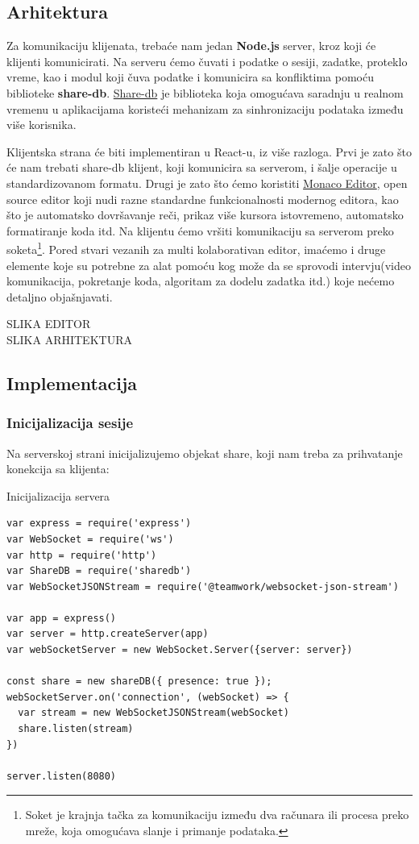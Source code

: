 \documentclass[12pt]{article}
\begin{document}
\subsection{Arhitektura}

Za komunikaciju klijenata, trebaće nam jedan \textbf{Node.js} server, kroz koji će klijenti komunicirati. Na serveru ćemo čuvati i podatke o sesiji, zadatke, proteklo vreme, kao i modul koji čuva podatke i komunicira sa konfliktima pomoću biblioteke \textbf{share-db}. \href{https://share.github.io/sharedb/}{Share-db} je biblioteka koja omogućava saradnju u realnom vremenu u aplikacijama koristeći mehanizam za sinhronizaciju podataka između više korisnika. 

Klijentska strana će biti implementiran u React-u, iz više razloga. Prvi je zato što će nam trebati share-db klijent, koji komunicira sa serverom, i šalje operacije u standardizovanom formatu. Drugi je zato što ćemo koristiti \href{https://microsoft.github.io/monaco-editor/}{Monaco Editor}, open source editor koji nudi razne standardne funkcionalnosti modernog editora, kao što je automatsko dovršavanje reči, prikaz više kursora istovremeno, automatsko formatiranje koda itd. Na klijentu ćemo vršiti komunikaciju sa serverom preko soketa\footnote{Soket je krajnja tačka za komunikaciju između dva računara ili procesa preko mreže, koja omogućava slanje i primanje podataka.}. Pored stvari vezanih za multi kolaborativan editor, imaćemo i druge elemente koje su potrebne za alat pomoću kog može da se sprovodi intervju(video komunikacija, pokretanje koda, algoritam za dodelu zadatka itd.) koje nećemo detaljno objašnjavati.

SLIKA EDITOR \\
SLIKA ARHITEKTURA

\subsection{Implementacija}

\subsubsection{Inicijalizacija sesije}

Na serverskoj strani inicijalizujemo objekat share, koji nam treba za prihvatanje konekcija sa klijenta:

\begin{mylisting}[label={lst:example}]{Inicijalizacija servera}
\begin{lstlisting}
var express = require('express')
var WebSocket = require('ws')
var http = require('http')
var ShareDB = require('sharedb')
var WebSocketJSONStream = require('@teamwork/websocket-json-stream')

var app = express()
var server = http.createServer(app)
var webSocketServer = new WebSocket.Server({server: server})

const share = new shareDB({ presence: true });
webSocketServer.on('connection', (webSocket) => {
  var stream = new WebSocketJSONStream(webSocket)
  share.listen(stream)
})

server.listen(8080)
\end{lstlisting}
\end{mylisting}
\end{document}
